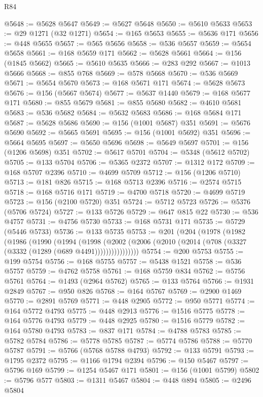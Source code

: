 \begin{lexlean}{R84}
\begin{coremodule}
@5648 := @5628 @5647
@5649 := @5627 @5648
@5650 := @5610 @5633
@5653 := @29 @1271 (@32 @1271)
@5654 := @165 @5653
@5655 := @5636 @171
@5656 := @448 @5655
@5657 := @565 @5656
@5658 := @536 @5657
@5659 := @5654 @5658
@5661 := @168 @5659 @171
@5662 := @5628 @5661
@5664 := @156 (@1845 @5662)
@5665 := @5610 @5635
@5666 := @283 @292
@5667 := @1013 @5666
@5668 := @855 @768
@5669 := @578 @5668
@5670 := @536 @5669
@5671 := @5654 @5670
@5673 := @168 @5671 @171
@5674 := @5628 @5673
@5676 := @156 (@5667 @5674)
@5677 := @5637 @1440
@5679 := @168 @5677 @171
@5680 := @855 @5679
@5681 := @855 @5680
@5682 := @4610 @5681
@5683 := @536 @5682
@5684 := @5632 @5683
@5686 := @168 @5684 @171
@5687 := @5628 @5686
@5690 := @156 (@1001 @5687) @351
@5691 := @5676 @5690
@5692 := @5665 @5691
@5695 := @156 (@1001 @5692) @351
@5696 := @5664 @5695
@5697 := @5650 @5696
@5698 := @5649 @5697
@5701 := @156 (@1206 @5698) @351
@5702 := @5617 @5701
@5704 := @5348 (@5612 @5702)
@5705 := @133 @5704
@5706 := @5365 @2372
@5707 := @1312 @172
@5709 := @168 @5707 @2396
@5710 := @4699 @5709
@5712 := @156 (@1206 @5710)
@5713 := @181 @826
@5715 := @168 @5713 @2396
@5716 := @2574 @5715
@5718 := @168 @5716 @171
@5719 := @4700 @5718
@5720 := @4699 @5719
@5723 := @156 (@2100 @5720) @351
@5724 := @5712 @5723
@5726 := @5376 (@5706 @5724)
@5727 := @133 @5726
@5729 := @647 @815 @22
@5730 := @536 @4757
@5731 := @4756 @5730
@5733 := @168 @5731 @171
@5735 := @5729 (@5446 @5733)
@5736 := @133 @5735
@5753 := @201
    (@204
      (@1978
        (@1982
          (@1986
            (@1990
              (@1994
                (@1998
                  (@2002 (@2006 (@2010 (@2014 (@708 (@3327 (@3332 (@1289 (@689 @4491))))))))))))))))
@5754 := @200 @5753
@5755 := @199 @5754
@5756 := @168 @5755
@5757 := @5438 @1521
@5758 := @536 @5757
@5759 := @4762 @5758
@5761 := @168 @5759 @834
@5762 := @5756 @5761
@5764 := @1493 (@2964 @5762)
@5765 := @133 @5764
@5766 := @1931 @2849
@5767 := @950 @826
@5768 := @164 @5767
@5769 := @2900 @1469
@5770 := @2891 @5769
@5771 := @448 @2905
@5772 := @950 @5771
@5774 := @164 @5772 @4793
@5775 := @448 @2913
@5776 := @1516 @5775
@5778 := @164 @5776 @4793
@5779 := @448 @2925
@5780 := @1516 @5779
@5782 := @164 @5780 @4793
@5783 := @837 @171
@5784 := @4788 @5783
@5785 := @5782 @5784
@5786 := @5778 @5785
@5787 := @5774 @5786
@5788 := @5770 @5787
@5791 := @5766 (@5768 @5788 @4793)
@5792 := @133 @5791
@5793 := @1795 @2372
@5795 := @1166 @1794 @2394
@5796 := @150 @5467
@5797 := @5796 @169
@5799 := @1254 @5467 @171
@5801 := @156 (@1001 @5799)
@5802 := @5796 @577
@5803 := @1311 @5467
@5804 := @448 @894
@5805 := @2496 @5804

\end{coremodule}
\end{lexlean}
